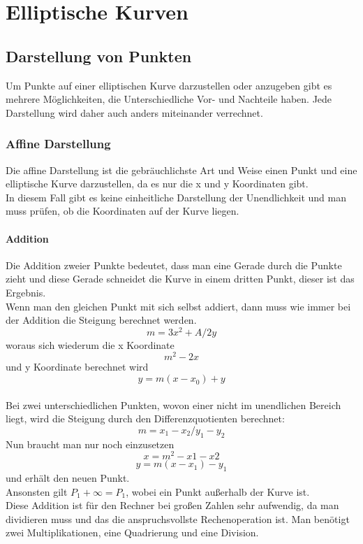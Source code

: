 \chapter{Elliptische Kurven}
\section{Darstellung von Punkten}
Um Punkte auf einer elliptischen Kurve darzustellen oder anzugeben gibt es mehrere Möglichkeiten, die Unterschiedliche Vor- und Nachteile haben. Jede Darstellung wird daher auch anders miteinander verrechnet.
\subsection{Affine Darstellung}
Die affine Darstellung ist die gebräuchlichste Art und Weise einen Punkt und eine elliptische Kurve darzustellen, da es nur die x und y Koordinaten gibt.\\
In diesem Fall gibt es keine einheitliche Darstellung der Unendlichkeit und man muss prüfen, ob die Koordinaten auf der Kurve liegen.
\subsubsection{Addition}
Die Addition zweier Punkte bedeutet, dass man eine Gerade durch die Punkte zieht und diese Gerade schneidet die Kurve in einem dritten Punkt, dieser ist das Ergebnis.\\
Wenn man den gleichen Punkt mit sich selbst addiert, dann muss wie immer bei der Addition die Steigung berechnet werden. \[m = 3x^2+A / 2y\]
woraus sich wiederum die x Koordinate \[m^2-2x\] und y Koordinate berechnet wird \[y = m(x - x_0)+y\]\\
Bei zwei unterschiedlichen Punkten, wovon einer nicht im unendlichen Bereich liegt, wird die Steigung durch den Differenzquotienten berechnet: \[m = x_1-x_2 / y_1 - y_2\]
Nun braucht man nur noch einzusetzen \[x = m^2 -x1 - x2\] \[y = m(x-x_1)-y_1\] und erhält den neuen Punkt.\\
Ansonsten gilt \(P_1 + \infty = P_1\), wobei \infty ein Punkt außerhalb der Kurve ist.\\
Diese Addition ist für den Rechner bei großen Zahlen sehr aufwendig, da man dividieren muss und das die anspruchsvollste Rechenoperation ist. Man benötigt zwei Multiplikationen, eine Quadrierung und eine Division.
